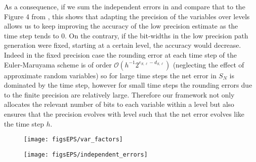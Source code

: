 As a consequence, if we sum the independent errors in  and compare that to the Figure 4 from \cite{Rounding_error_oliver}, this shows that adapting the precision of the variables over levels allows us to keep improving the accuracy of the low precision estimate as the time step tends to 0. On the contrary, if the bit-widths in the low precision path generation were fixed, starting at a certain level, the accuracy would decrease. Indeed in the fixed precision case the rounding error at each time step of the Euler-Maruyama scheme is of order $\mathcal{O}(h^{-1}2^{e_{S,\ell}-d_{S,\ell}})$ \cite{arciniega,Rounding_error_oliver} (neglecting the effect of approximate random variables) so for large time steps the net error in $S_N$ is dominated by the time step, however for small time steps the rounding errors due to the finite precision are relatively large. Therefore %
our framework not only allocates the relevant number of bits to each variable within a level but %
also ensures that the precision evolves with level such that the net error evolves like the time step $h$.


\begin{figure}[h]
\centering
\begin{minipage}{.48\textwidth}
  \centering
  \texttt{[image: figsEPS/var\_factors]}
  \label{fig:var_factor}
\end{minipage}%
\hspace{0.02\textwidth}
\begin{minipage}{.48\textwidth}
  \centering
  \texttt{[image: figsEPS/independent\_errors]}
  \label{fig:indep_errors}
\end{minipage}
\end{figure}


